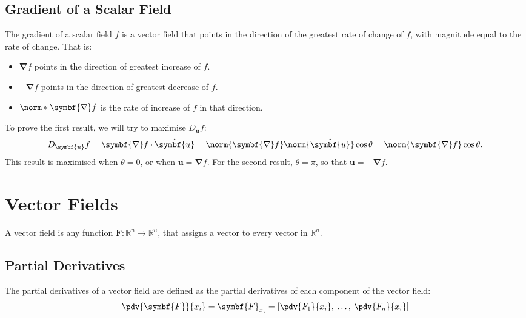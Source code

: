 \documentclass{article}
\begin{document}
\subsection{Gradient of a Scalar Field}
The gradient of a scalar field \(f\) is a vector field that points in
the direction of the greatest rate of change of \(f\), with magnitude
equal to the rate of change. That is:
\begin{itemize}
    \item \(\symbf{\nabla} f\) points in the direction of greatest increase of \(f\).
    \item \(-\symbf{\nabla} f\) points in the direction of greatest decrease of \(f\).
    \item \(\norm*{\symbf{\nabla} f}\) is the rate of increase of \(f\) in that direction.
\end{itemize}
To prove the first result, we will try to maximise \(D_{\symbf{u}} f\):
\begin{equation*}
    D_{\symbf{u}} f = \symbf{\nabla} f \cdot \hat{\symbf{u}} = \norm{\symbf{\nabla} f} \norm{\hat{\symbf{u}}} \cos{\theta} = \norm{\symbf{\nabla} f} \cos{\theta}.
\end{equation*}
This result is maximised when \(\theta = 0\), or when
\(\symbf{u} = \symbf{\nabla} f\). For the second result, \(\theta = \pi\),
so that \(\symbf{u} = -\symbf{\nabla} f\).
\section{Vector Fields}
A vector field is any function \(\symbf{F} : \mathbb{R}^n \to
\mathbb{R}^n\), that assigns a vector to every vector in
\(\mathbb{R}^n\).
\subsection{Partial Derivatives}
The partial derivatives of a vector field are defined as the partial
derivatives of each component of the vector field:
\begin{equation*}
    \pdv{\symbf{F}}{x_i} = \symbf{F}_{x_i} = \left[ \pdv{F_1}{x_i}, \: \ldots, \: \pdv{F_n}{x_i} \right]
\end{equation*}
\end{document}
